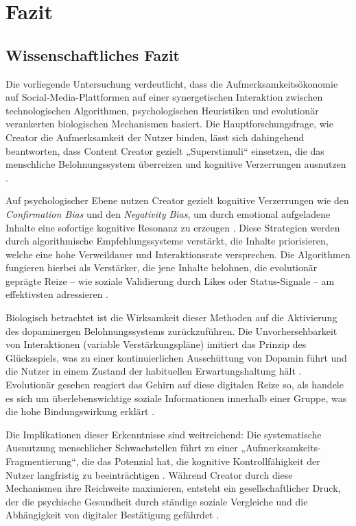 \documentclass[11pt,a4paper]{article}
\begin{document}
\section{Fazit}

\subsection{Wissenschaftliches Fazit}

Die vorliegende Untersuchung verdeutlicht, dass die Aufmerksamkeitsökonomie auf Social-Media-Plattformen auf einer synergetischen Interaktion zwischen technologischen Algorithmen, psychologischen Heuristiken und evolutionär verankerten biologischen Mechanismen basiert. Die Hauptforschungsfrage, wie Creator die Aufmerksamkeit der Nutzer binden, lässt sich dahingehend beantworten, dass Content Creator gezielt „Superstimuli“ einsetzen, die das menschliche Belohnungssystem überreizen und kognitive Verzerrungen ausnutzen .

Auf psychologischer Ebene nutzen Creator gezielt kognitive Verzerrungen wie den \textit{Confirmation Bias} und den \textit{Negativity Bias}, um durch emotional aufgeladene Inhalte eine sofortige kognitive Resonanz zu erzeugen . Diese Strategien werden durch algorithmische Empfehlungssysteme verstärkt, die Inhalte priorisieren, welche eine hohe Verweildauer und Interaktionsrate versprechen. Die Algorithmen fungieren hierbei als Verstärker, die jene Inhalte belohnen, die evolutionär geprägte Reize – wie soziale Validierung durch Likes oder Status-Signale – am effektivsten adressieren .

Biologisch betrachtet ist die Wirksamkeit dieser Methoden auf die Aktivierung des dopaminergen Belohnungssystems zurückzuführen. Die Unvorhersehbarkeit von Interaktionen (variable Verstärkungspläne) imitiert das Prinzip des Glücksspiels, was zu einer kontinuierlichen Ausschüttung von Dopamin führt und die Nutzer in einem Zustand der habituellen Erwartungshaltung hält . Evolutionär gesehen reagiert das Gehirn auf diese digitalen Reize so, als handele es sich um überlebenswichtige soziale Informationen innerhalb einer Gruppe, was die hohe Bindungswirkung erklärt .

Die Implikationen dieser Erkenntnisse sind weitreichend: Die systematische Ausnutzung menschlicher Schwachstellen führt zu einer „Aufmerksamkeits-Fragmentierung“, die das Potenzial hat, die kognitive Kontrollfähigkeit der Nutzer langfristig zu beeinträchtigen . Während Creator durch diese Mechanismen ihre Reichweite maximieren, entsteht ein gesellschaftlicher Druck, der die psychische Gesundheit durch ständige soziale Vergleiche und die Abhängigkeit von digitaler Bestätigung gefährdet .
\end{document}
